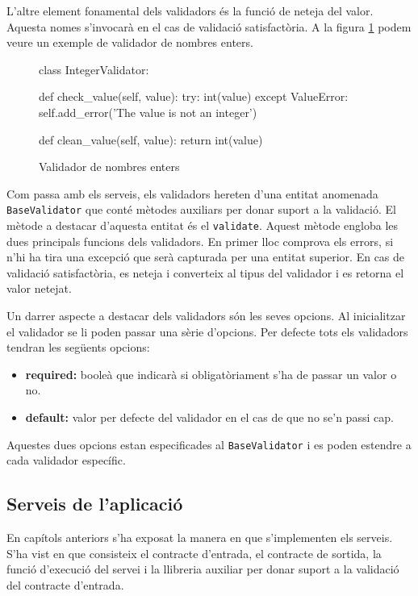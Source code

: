 	L'altre element fonamental dels validadors és la funció de neteja del valor. Aquesta nomes s'invocarà en el cas de validació satisfactòria.  A la figura \ref{fig:int_validador} podem veure un exemple de validador de nombres enters.\\
	
	\begin{figure}[h!]
		\begin{python}
class IntegerValidator:

	def check_value(self, value):
		try:
			int(value)
		except ValueError:
			self.add_error('The value is not an integer')
			
	def clean_value(self, value):
		return int(value)
		\end{python}
		\caption{Validador de nombres enters}
		\label{fig:int_validador}
	\end{figure}	
	 
	 Com passa amb els serveis, els validadors hereten d'una entitat anomenada \texttt{BaseValidator} que conté mètodes auxiliars per donar suport a la validació. El mètode a destacar d'aquesta entitat és el \texttt{validate}. Aquest mètode engloba les dues principals funcions dels validadors. En primer lloc comprova els errors, si n'hi ha tira una excepció que serà capturada per una entitat superior. En cas de validació satisfactòria, es neteja i converteix al tipus del validador i es retorna el valor netejat.
	 
	 Un darrer aspecte a destacar dels validadors són les seves opcions. Al inicialitzar el validador se li poden passar una sèrie d'opcions. Per defecte tots els validadors tendran les següents opcions:
	 
	 \begin{itemize}
	 	\item \textbf{required:} booleà que indicarà si obligatòriament s'ha de passar un valor o no.
	 	\item \textbf{default:} valor per defecte del validador en el cas de que no se'n passi cap.
	 \end{itemize}
	 
	 Aquestes dues opcions estan especificades al \texttt{BaseValidator} i es poden estendre a cada validador específic.
	 
	\subsection{Serveis de l'aplicació} \label{serveis_aplicacio}
	
		En capítols anteriors s'ha exposat la manera en que s'implementen els serveis. S'ha vist en que consisteix el contracte d'entrada, el contracte de sortida, la funció d'execució del servei i la llibreria auxiliar per donar suport a la validació del contracte d'entrada.\\
		
